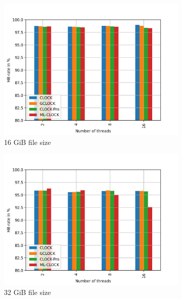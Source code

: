 \documentclass[
	12pt,
	a4paper,
	abstract,
	bibliography=totoc,
	chapterprefix,
	headings=openright,
	numbers=endperiod,
	parskip=half,
	twoside,
]{scrreprt}
\begin{document}
\begin{figure}[H]
	\centering
	\begin{subfigure}{0.4\textwidth}
		\includegraphics[width=\textwidth]{multi_16_gb_rw_90to10_uniform.jpg}		
		\caption{16 GiB file size}
		\label{fig:rw_90to10 16 uniform}
	\end{subfigure}
	\hfill
	\begin{subfigure}{0.4\textwidth}
		\includegraphics[width=\textwidth]{multi_32_gb_rw_90to10_uniform.jpg}		
		\caption{32 GiB file size}
		\label{fig:rw_90to10 32 uniform}
	\end{subfigure}
	\hfill
	\begin{subfigure}{0.4\textwidth}

\end{subfigure}
\end{figure}
\end{document}
